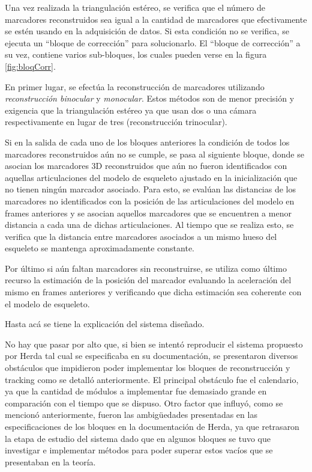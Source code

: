 Una vez realizada la triangulación estéreo, se verifica que el número de marcadores reconstruidos sea igual a la cantidad de marcadores que efectivamente se estén usando en la adquisición de datos. Si esta condición no se verifica, se ejecuta un “bloque de corrección” para solucionarlo. El “bloque de corrección” a su vez, contiene  varios sub-bloques, los cuales pueden verse en la figura \ref{fig:bloqCorr}.

En primer lugar, se efectúa la reconstrucción de marcadores utilizando \emph{reconstrucción binocular} y \emph{monocular}. Estos métodos son de menor precisión y exigencia que la triangulación estéreo ya que usan dos o una cámara respectivamente en lugar de tres (reconstrucción trinocular).

 Si en la salida de cada uno de los bloques anteriores la condición de todos los marcadores reconstruidos aún no se cumple, se pasa al siguiente bloque, donde se asocian los marcadores 3D reconstruidos que aún no fueron identificados con aquellas articulaciones del modelo de esqueleto ajustado en la inicialización que no tienen ningún marcador asociado. Para esto, se evalúan las distancias de los marcadores no identificados con la posición de las articulaciones del modelo en frames anteriores y se asocian aquellos marcadores que se encuentren a menor distancia a cada una de dichas articulaciones. Al tiempo que se realiza esto, se verifica que la distancia entre marcadores asociados a un mismo hueso del esqueleto se mantenga aproximadamente constante.
 
Por último si aún faltan marcadores sin reconstruirse, se utiliza como último recurso la estimación de la posición del marcador evaluando la aceleración del mismo en frames anteriores y verificando que dicha estimación sea coherente con el modelo de esqueleto.


Hasta acá se tiene la explicación del sistema diseñado. 

No hay que pasar por alto que, si bien se intentó reproducir el sistema propuesto por Herda\cite{herda} tal cual se especificaba en su documentación, se presentaron diversos obstáculos que impidieron poder implementar los bloques de reconstrucción y tracking como se detalló anteriormente. El principal obstáculo fue el calendario, ya que la cantidad de módulos a implementar fue demasiado grande en comparación con el tiempo que se dispuso. Otro factor que influyó, como se mencionó anteriormente, fueron las ambigüedades presentadas en las especificaciones de los bloques en la documentación de Herda\cite{herda}, ya que retrasaron la etapa de estudio del sistema dado que en algunos bloques se tuvo que investigar e implementar métodos para poder superar estos vacíos que se presentaban en la teoría.

